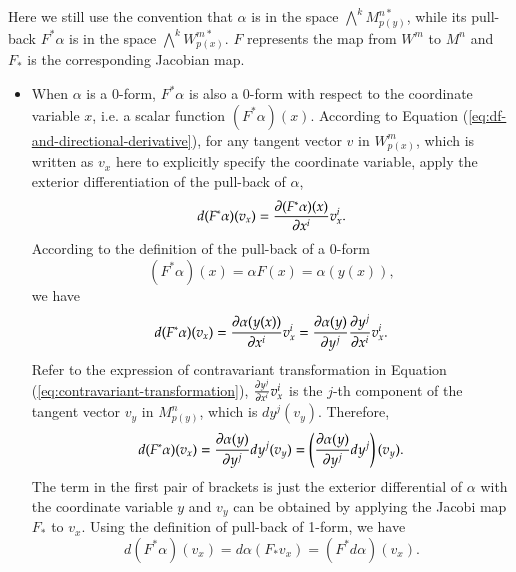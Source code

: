 \documentclass[11pt, a4paper]{book}
\begin{document}
\begin{enumerate}
  \begin{Proof}
    Here we still use the convention that $\alpha$ is in the space
    $\bigwedge^k M_{p(y)}^{n*}$, while its pull-back $F^{*}\alpha$ is in the space
    $\bigwedge^k W_{p(x)}^{m*}$. $F$ represents the map from $W^m$ to $M^n$ and $F_{*}$ is the
    corresponding Jacobian map.
    \begin{itemize}
    \item When $\alpha$ is a 0-form, $F^{*}\alpha$ is also a 0-form with respect to the
      coordinate variable $x$, i.e. a scalar function $(F^{*}\alpha)(x)$. According to
      Equation (\ref{eq:df-and-directional-derivative}), for any tangent vector $v$ in
      $W_{p(x)}^m$, which is written as $v_x$ here to explicitly specify the coordinate
      variable, apply the exterior differentiation of the pull-back of $\alpha$,
      \begin{equation*}
        d(F^{*}\alpha)(v_x) = \frac{\partial (F^{*}\alpha)(x)}{\partial x^i} v_x^i.
      \end{equation*}
      According to the definition of the pull-back of a 0-form
      \begin{equation*}
        (F^{*}\alpha)(x) = \alpha F(x) = \alpha(y(x)),
      \end{equation*}
      we have
      \begin{equation*}
        d(F^{*}\alpha)(v_x) = \frac{\partial \alpha(y(x))}{\partial x^i} v_x^i = \frac{\partial
          \alpha(y)}{\partial y^j} \frac{\partial y^j}{\partial x^i} v_x^i.
      \end{equation*}
      Refer to the expression of contravariant transformation in Equation
      (\ref{eq:contravariant-transformation}), $\frac{\partial y^j}{\partial x^i}v_x^i$ is the
      $j$-th component of the tangent vector $v_y$ in $M_{p(y)}^n$, which is $dy^j(v_y)$.
      Therefore,
      \begin{equation*}
        d(F^{*}\alpha)(v_x) = \frac{\partial \alpha(y)}{\partial y^j} dy^j(v_y) = \left(
          \frac{\partial \alpha(y)}{\partial y^j} dy^j \right)(v_y).
      \end{equation*}
      The term in the first pair of brackets is just the exterior differential of $\alpha$
      with the coordinate variable $y$ and $v_y$ can be obtained by applying the Jacobi
      map $F_*$ to $v_x$. Using the definition of pull-back of 1-form, we have
      \begin{equation*}
        d(F^{*}\alpha)(v_x) = d\alpha(F_{*}v_x) = (F^{*} d\alpha)(v_x).
      \end{equation*}

\end{itemize}
\end{Proof}
\end{enumerate}
\end{document}
